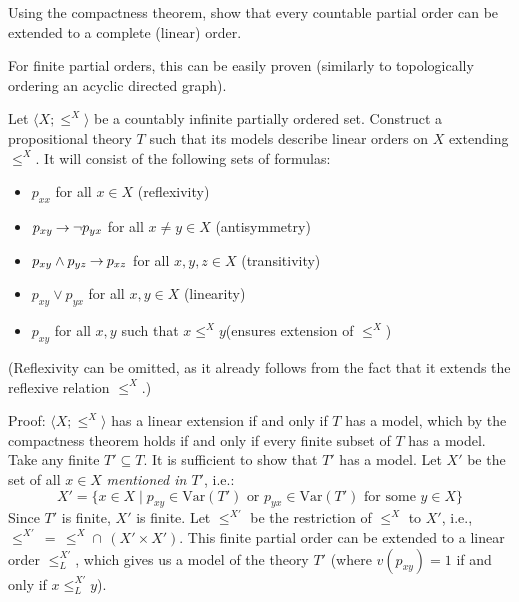 \begin{problem}
    Using the compactness theorem, show that every countable partial order can be extended to a complete (linear) order.

    \begin{solution}

        For finite partial orders, this can be easily proven (similarly to topologically ordering an acyclic directed graph). 
        
        Let $\langle X;\leq^X\rangle$ be a countably infinite partially ordered set. Construct a propositional theory $T$ such that its models describe linear orders on $X$ extending $\leq^X$. It will consist of the following sets of formulas:
        \begin{itemize}
            \item $p_{xx}$ for all $x\in X$ \hfill (reflexivity)
            \item $p_{xy}\mathbin{\rightarrow}\neg p_{yx}$ for all $x\neq y\in X$ \hfill (antisymmetry)
            \item $p_{xy}\land p_{yz}\mathbin{\rightarrow} p_{xz}$ for all $x,y,z\in X$ \hfill (transitivity)
            \item $p_{xy}\lor p_{yx}$ for all $x,y\in X$ \hfill (linearity)
            \item $p_{xy}$ for all $x,y$ such that $x\leq^X y$\hfill (ensures extension of $\leq^X$)
        \end{itemize}
        (Reflexivity can be omitted, as it already follows from the fact that it extends the reflexive relation $\leq^X$.)

        Proof: $\langle X;\leq^X\rangle$ has a linear extension if and only if $T$ has a model, which by the compactness theorem holds if and only if every finite subset of $T$ has a model. Take any finite $T'\subseteq T$. It is sufficient to show that $T'$ has a model. Let $X'$ be the set of all $x\in X$ \emph{mentioned in $T'$}, i.e.:
        $$
        X'=\{x\in X\mid p_{xy}\in\mathrm{Var}(T')\text{ or }p_{yx}\in\mathrm{Var}(T')\text{ for some }y\in X\}
        $$
        Since $T'$ is finite, $X'$ is finite. Let $\leq^{X'}$ be the restriction of $\leq^X$ to $X'$, i.e., $\leq^{X'}\,=\,\leq^X \mathbin{\cap}\, (X'\times X')$. This finite partial order can be extended to a linear order $\leq^{X'}_L$, which gives us a model of the theory $T'$ (where $v(p_{xy})=1$ if and only if $x\leq^{X'}_L y$).
        
    \end{solution}
    
\end{problem}
        
